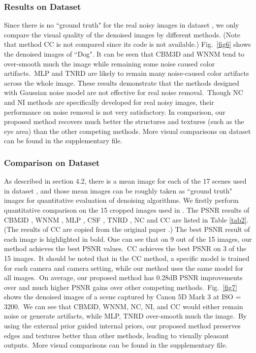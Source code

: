 \documentclass[10pt,twocolumn,letterpaper]{article}
\begin{document}
\vspace{-1mm}
\subsubsection{Results on Dataset \cite{ncwebsite}}

Since there is no ``ground truth" for the real noisy images in  dataset \cite{ncwebsite}, we only compare the visual quality of the denoised images by different methods. (Note that method CC \cite{crosschannel2016} is not compared since its code is not available.) Fig.\ \ref{fig6} shows the denoised images of ``Dog". It can be seen that CBM3D and WNNM tend to over-smooth much the image while remaining some noise caused color artifacts.\ MLP and TNRD are likely to remain many noise-caused color artifacts across the whole image. These results demonstrate that the methods designed with Gaussian noise model are not effective for real noise removal.\ Though NC and NI methods are specifically developed for real noisy images, their performance on noise removal is not very satisfactory. In comparison, our proposed method recovers much better the structures and textures (such as the eye area) than the other competing methods. More visual comparisons on dataset \cite{ncwebsite} can be found in the supplementary file.

\vspace{-2mm}
\subsubsection{Comparison on Dataset \cite{crosschannel2016}}

As described in section 4.2, there is a mean image for each of the 17 scenes used in dataset \cite{crosschannel2016}, and those mean images can be roughly taken as ``ground truth" images for quantitative evaluation of denoising algorithms. We firstly perform quantitative comparison on the 15 cropped images used in \cite{crosschannel2016}. The PSNR results of CBM3D \cite{bm3d}, WNNM \cite{wnnm}, MLP \cite{mlp}, CSF \cite{csf}, TNRD \cite{chen2015learning}, NC \cite{noiseclinic} and
CC \cite{crosschannel2016} are listed in Table \ref{tab2}. (The results of CC are copied from the original paper \cite{crosschannel2016}.) The best PSNR result of each image is highlighted in bold. One can see that on 9 out of the 15 images, our method achieves the best PSNR values.\ CC achieves the best PSNR on 3 of the 15 images.\ It should be noted that in the CC method, a specific model is trained for each camera and camera setting, while our method uses the same model for all images.\ On average, our proposed method has 0.28dB PSNR improvements over \cite{crosschannel2016} and much higher PSNR gains over other competing methods.\ Fig.\ \ref{fig7} shows the denoised images of a scene captured by Canon 5D Mark 3 at ISO = 3200.\ We can see that CBM3D, WNNM, NC, NI, and CC would either remain noise or generate artifacts, while MLP, TNRD over-smooth much the image.\ By using the external prior guided internal priors, our proposed method preserves edges and textures better than other methods, leading to visually pleasant outputs.\ More visual comparisons can be found in the supplementary file.
\end{document}
